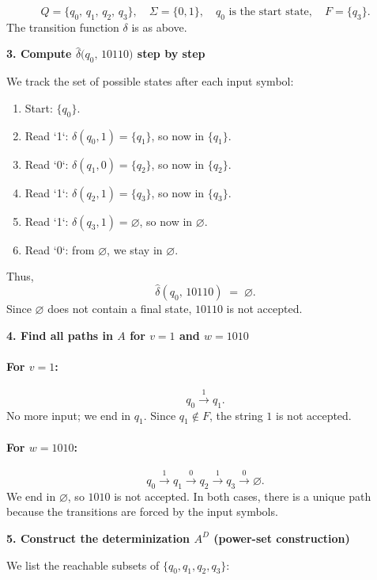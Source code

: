 \documentclass{article}
\theoremstyle{theorem}
\theoremstyle{definition}
\theoremstyle{remark}
\begin{document}
\[
Q = \{q_0,\, q_1,\, q_2,\, q_3\}, \quad
\Sigma = \{0,1\}, \quad
q_0 \text{ is the start state}, \quad
F = \{q_3\}.
\]
The transition function $\delta$ is as above.

\textbf{3. Compute $\hat{\delta}\bigl(q_0,\,10110\bigr)$ step by step}

We track the set of possible states after each input symbol:

\begin{enumerate}
\item Start: $\{q_0\}$.
\item Read `1`: $\delta(q_0,1) = \{q_1\}$, so now in $\{q_1\}$.
\item Read `0`: $\delta(q_1,0) = \{q_2\}$, so now in $\{q_2\}$.
\item Read `1`: $\delta(q_2,1) = \{q_3\}$, so now in $\{q_3\}$.
\item Read `1`: $\delta(q_3,1) = \varnothing$, so now in $\varnothing$.
\item Read `0`: from $\varnothing$, we stay in $\varnothing$.
\end{enumerate}

Thus,
\[
\hat{\delta}(q_0,\,10110) \;=\; \varnothing.
\]
Since $\varnothing$ does not contain a final state, $10110$ is not accepted.

\textbf{4. Find all paths in $A$ for $v = 1$ and $w = 1010$}

\paragraph{For $v = 1$:}
\[
q_0 \xrightarrow{\,1\,} q_1.
\]
No more input; we end in $q_1$. Since $q_1 \notin F$, the string $1$ is 
not accepted.

\paragraph{For $w = 1010$:}
\[
q_0 \xrightarrow{\,1\,} q_1 
\xrightarrow{\,0\,} q_2 
\xrightarrow{\,1\,} q_3 
\xrightarrow{\,0\,} \varnothing.
\]
We end in $\varnothing$, so $1010$ is not accepted. 
In both cases, there is a unique path because the transitions 
are forced by the input symbols.

\textbf{5. Construct the determinization $A^D$ (power-set construction)}

We list the reachable subsets of $\{q_0, q_1, q_2, q_3\}$:
\end{document}
